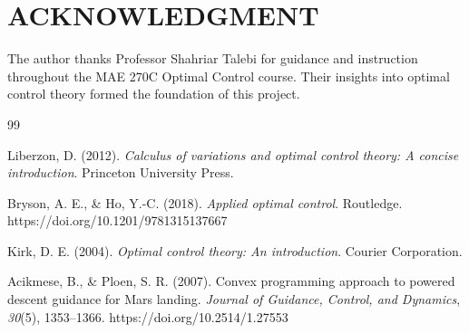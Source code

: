 \documentclass[letterpaper, 10 pt, conference]{ieeeconf}
\begin{document}
\addtolength{\textheight}{-5cm}  

\section*{ACKNOWLEDGMENT}

The author thanks Professor Shahriar Talebi for guidance and instruction throughout the MAE 270C Optimal Control course. Their insights into optimal control theory formed the foundation of this project.

\begin{thebibliography}{99}

Liberzon, D. (2012). \emph{Calculus of variations and optimal control theory: A concise introduction}. Princeton University Press.

Bryson, A. E., \& Ho, Y.-C. (2018). \emph{Applied optimal control}. Routledge. https://doi.org/10.1201/9781315137667

Kirk, D. E. (2004). \emph{Optimal control theory: An introduction}. Courier Corporation.

Acikmese, B., \& Ploen, S. R. (2007). Convex programming approach to powered descent guidance for Mars landing. \emph{Journal of Guidance, Control, and Dynamics}, \emph{30}(5), 1353--1366. https://doi.org/10.2514/1.27553

\end{thebibliography}
\end{document}
